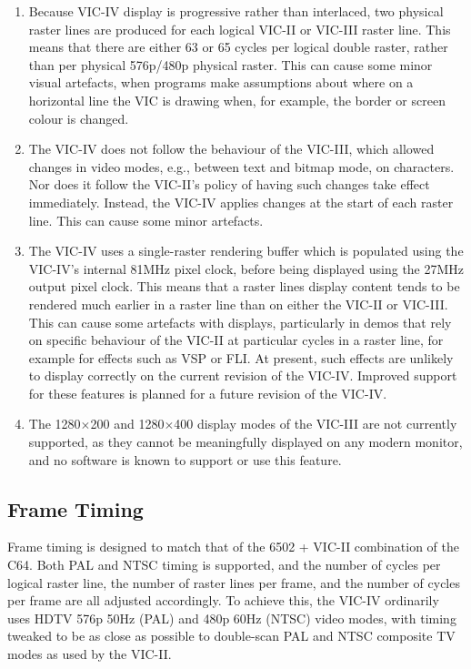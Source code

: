 \begin{enumerate}
\item Because VIC-IV display is progressive rather than interlaced, two physical raster lines are produced for each logical VIC-II or VIC-III raster line.  This means that there are either 63 or 65 cycles per logical double raster, rather than per physical 576p/480p physical raster. This can cause some minor visual artefacts, when programs make assumptions about where on a horizontal line the VIC is drawing when, for example, the border or screen colour is changed.
\item The VIC-IV does not follow the behaviour of the VIC-III, which allowed changes in video modes, e.g., between text and bitmap mode, on characters.  Nor does it follow the VIC-II's policy of having such changes take effect immediately.  Instead, the VIC-IV applies changes at the start of each raster line.  This can cause some minor artefacts.
\item The VIC-IV uses a single-raster rendering buffer which is populated using the VIC-IV's internal 81MHz pixel clock, before being displayed using the 27MHz output pixel clock.  This means that a raster lines display content tends to be rendered much earlier in a raster line than on either the VIC-II or VIC-III.  This can cause some artefacts with displays, particularly in demos that rely on specific behaviour of the VIC-II at particular cycles in a raster line, for example for effects such as VSP or FLI.  At present, such effects are unlikely to display correctly on the current revision of the VIC-IV.  Improved support for these features is planned for a future revision of the VIC-IV.
  \item The 1280$\times$200 and 1280$\times$400 display modes of the VIC-III are not currently supported, as they cannot be meaningfully displayed on any modern monitor, and no software is known to support or use this feature.
\end{enumerate}

\subsection{Frame Timing}

Frame timing is designed to match that of the 6502 + VIC-II combination of the C64.  Both PAL and NTSC timing is supported, and the number of cycles per logical raster line, the number of raster lines per frame, and the number of cycles per frame are all adjusted accordingly.  To achieve this, the VIC-IV ordinarily uses HDTV 576p 50Hz (PAL) and 480p 60Hz (NTSC) video modes, with timing tweaked to be as close as possible to double-scan PAL and NTSC composite TV modes as used by the VIC-II.

